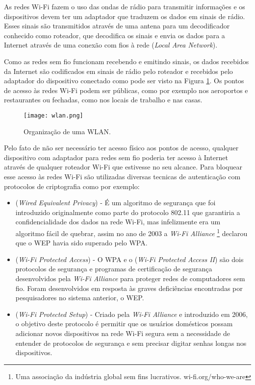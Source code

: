 As redes Wi-Fi fazem o uso das ondas de rádio para transmitir informações e os dispositivos devem ter um adaptador que traduzem os dados em sinais de rádio. Esses sinais são transmitidos através de uma antena para um decodificador conhecido como roteador, que decodifica os sinais e envia os dados para a Internet através de uma conexão com fios à rede  (\textit{Local Area Network}).

Como as redes sem fio funcionam recebendo e emitindo sinais, os dados recebidos da Internet são codificados em sinais de rádio pelo roteador e recebidos pelo adaptador do dispositivo conectado como pode ser visto na Figura \ref{fig:wlan}.
Os pontos de acesso às redes Wi-Fi podem ser públicas, como por exemplo nos aeroportos e restaurantes ou fechadas, como nos locais de trabalho e nas casas.

\begin{figure}[!htb]
	\centering
	\texttt{[image: wlan.png]} %
	\caption[Organização de uma WLAN]{Organização de uma WLAN.}
	\label{fig:wlan}
\end{figure}

Pelo fato de não ser necessário ter acesso físico aos pontos de acesso, qualquer dispositivo com adaptador para redes sem fio poderia ter acesso à Internet através de qualquer roteador Wi-Fi que estivesse no seu alcance. Para bloquear esse acesso às redes Wi-Fi são utilizadas diversas tecnicas de autenticação com protocolos de criptografia como por exemplo:
\begin{itemize}
  \item {} (\textit{Wired Equivalent Privacy})
  - É um algoritmo de segurança que foi introduzido originalmente como parte do protocolo 802.11 que garantiria a confidencialidade dos dados na rede Wi-Fi, mas infelizmente era um algoritmo fácil de quebrar, assim no ano de 2003 a \textit{Wi-Fi Alliance} \footnote{Uma associação da indústria global sem fins lucrativos. wi-fi.org/who-we-are} declarou que o WEP havia sido superado pelo WPA.
  \item {} (\textit{Wi-Fi Protected Access})
  - O WPA e o  (\textit{Wi-Fi Protected Access II}) são dois protocolos de segurança e programas de certificação de segurança desenvolvidos pela \textit{Wi-Fi Alliance} para proteger redes de computadores sem fio. Foram desenvolvidos em resposta às graves deficiências encontradas por pesquisadores no sistema anterior, o WEP.
  \item {} (\textit{Wi-Fi Protected Setup})
  - Criado pela \textit{Wi-Fi Alliance} e introduzido em 2006, o objetivo deste protocolo é permitir que os usuários domésticos
  possam adicionar novos dispositivos na rede Wi-Fi segura sem a necessidade de entender de protocolos de segurança e sem precisar digitar senhas longas nos dispositivos.
\end{itemize}

